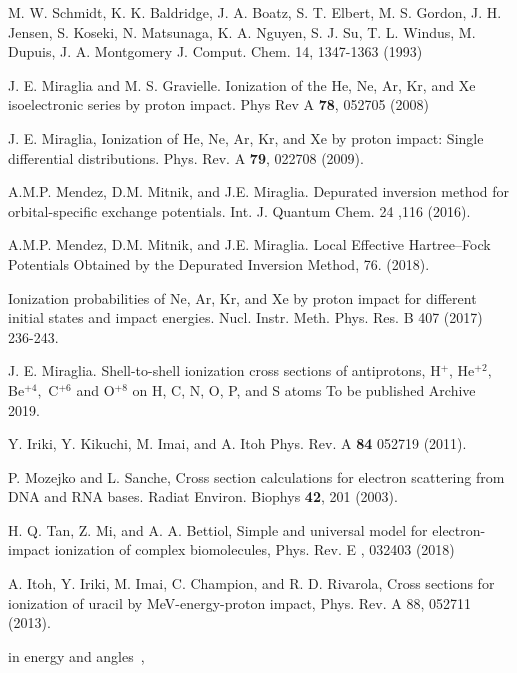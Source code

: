 \documentclass[preprint,12pt]{article}
\begin{document}
\begin{thebibliography}{99}

M. W. Schmidt, K. K. Baldridge, J. A. Boatz, S. T. Elbert, M. S. Gordon, 
J. H. Jensen, S. Koseki, N. Matsunaga, K. A. Nguyen, S. J. Su, T. L. Windus, 
M. Dupuis, J. A. Montgomery 
J. Comput. Chem. 14, 1347-1363 (1993)

J. E. Miraglia and M. S. Gravielle. Ionization of the
He, Ne, Ar, Kr, and Xe isoelectronic series by proton impact. 
Phys Rev A \textbf{78}, 052705 (2008)

J. E. Miraglia, Ionization of He, Ne, Ar, Kr, and Xe
by proton impact: Single differential distributions. 
Phys. Rev. A \textbf{79}, 022708 (2009).

A.M.P. Mendez, D.M. Mitnik, and J.E. Miraglia.
Depurated inversion method for orbital-specific exchange potentials. 
Int. J. Quantum Chem. 24 ,116 (2016).

A.M.P. Mendez, D.M. Mitnik, and J.E. Miraglia. Local Effective 
Hartree--Fock Potentials Obtained by the Depurated Inversion Method,
76. (2018).

Ionization probabilities of Ne, Ar, Kr, and Xe by
proton impact for different initial states and impact energies. 
Nucl. Instr. Meth. Phys. Res. B 407 (2017) 236-243.

J. E. Miraglia. Shell-to-shell ionization cross
sections of antiprotons, H$^{+}$, He$^{+2},$ Be$^{+4},$ C$^{+6}$ and 
O$^{+8}$ on H, C, N, O, P, and S atoms To be published Archive 2019.

Y. Iriki, Y. Kikuchi, M. Imai, and A. Itoh
Phys. Rev. A \textbf{84} 052719 (2011).

P. Mozejko and L. Sanche, 
Cross section calculations for electron scattering from DNA and RNA bases.
Radiat Environ. Biophys \textbf{42}, 201 (2003).

H. Q. Tan, Z. Mi, and A. A. Bettiol, 
Simple and universal model for electron-impact ionization of complex biomolecules, 
Phys. Rev. E , 032403 (2018)

A. Itoh, Y. Iriki, M. Imai, C. Champion, and R. D. Rivarola, 
Cross sections for ionization of uracil by MeV-energy-proton impact, 
Phys. Rev. A 88, 052711 (2013).

\bibitem{} in energy and angles~,


\end{thebibliography}
\end{document}
